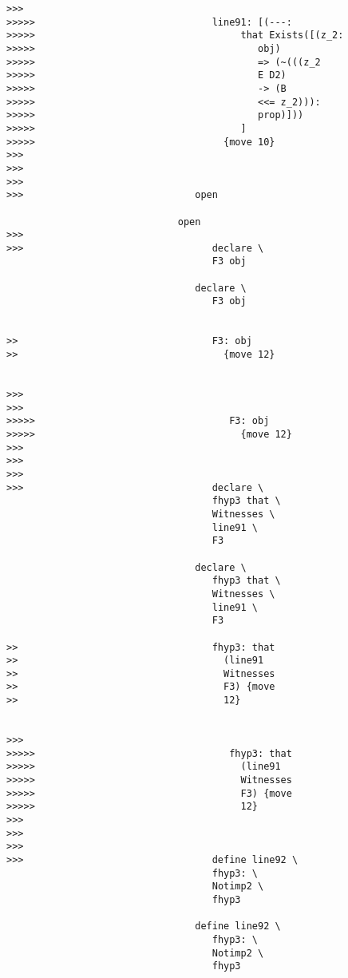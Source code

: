 \documentclass[12pt]{article}
\begin{document}
\begin{verbatim}
>>>
>>>>>                               line91: [(---:
>>>>>                                    that Exists([(z_2:
>>>>>                                       obj)
>>>>>                                       => (~(((z_2
>>>>>                                       E D2)
>>>>>                                       -> (B
>>>>>                                       <<= z_2))):
>>>>>                                       prop)]))
>>>>>                                    ]
>>>>>                                 {move 10}
>>>
>>>
>>>
>>>                              open

                              open
>>>
>>>                                 declare \
                                    F3 obj

                                 declare \
                                    F3 obj


>>                                  F3: obj
>>                                    {move 12}


>>>
>>>
>>>>>                                  F3: obj
>>>>>                                    {move 12}
>>>
>>>
>>>
>>>                                 declare \
                                    fhyp3 that \
                                    Witnesses \
                                    line91 \
                                    F3

                                 declare \
                                    fhyp3 that \
                                    Witnesses \
                                    line91 \
                                    F3

>>                                  fhyp3: that
>>                                    (line91
>>                                    Witnesses
>>                                    F3) {move
>>                                    12}


>>>
>>>>>                                  fhyp3: that
>>>>>                                    (line91
>>>>>                                    Witnesses
>>>>>                                    F3) {move
>>>>>                                    12}
>>>
>>>
>>>
>>>                                 define line92 \
                                    fhyp3: \
                                    Notimp2 \
                                    fhyp3

                                 define line92 \
                                    fhyp3: \
                                    Notimp2 \
                                    fhyp3


\end{verbatim}
\end{document}
